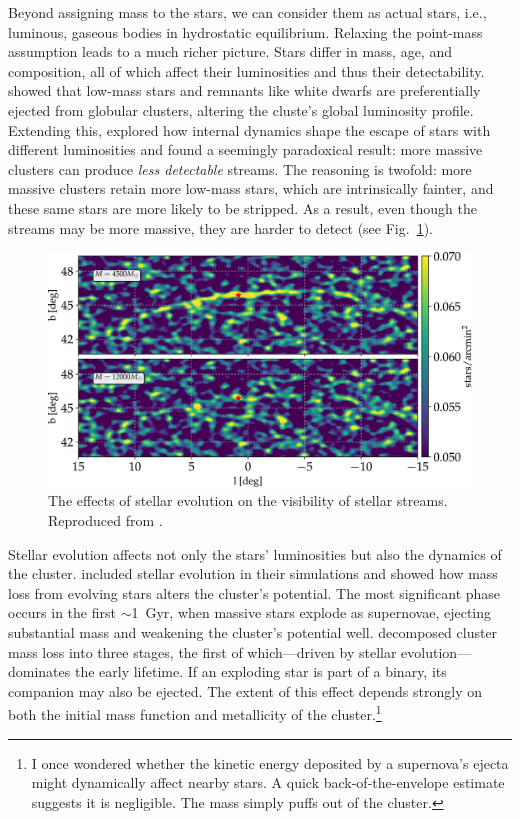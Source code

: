             Beyond assigning mass to the stars, we can consider them as actual stars, i.e., luminous, gaseous bodies in hydrostatic equilibrium. Relaxing the point-mass assumption leads to a much richer picture. Stars differ in mass, age, and composition, all of which affect their luminosities and thus their detectability. \citet{2008A&A...490..151K} showed that low-mass stars and remnants like white dwarfs are preferentially ejected from globular clusters, altering the cluste's global luminosity profile. Extending this, \citet{2018MNRAS.474.2479B} explored how internal dynamics shape the escape of stars with different luminosities and found a seemingly paradoxical result: more massive clusters can produce \textit{less detectable} streams. The reasoning is twofold: more massive clusters retain more low-mass stars, which are intrinsically fainter, and these same stars are more likely to be stripped. As a result, even though the streams may be more massive, they are harder to detect (see Fig.~\ref{fig:balbinot-2018}).
            \begin{figure}
                \includegraphics[width=\linewidth]{images/balbinot-2018.jpeg}
                \caption{The effects of stellar evolution on the visibility of stellar streams. Reproduced from \citep{2018MNRAS.474.2479B}.}
                \label{fig:balbinot-2018}
            \end{figure}
            Stellar evolution affects not only the stars' luminosities but also the dynamics of the cluster. \citet{2018MNRAS.474.2479B} included stellar evolution in their simulations and showed how mass loss from evolving stars alters the cluster's potential. The most significant phase occurs in the first $\sim$1~Gyr, when massive stars explode as supernovae, ejecting substantial mass and weakening the cluster's potential well. \citet{2010MNRAS.409..305L} decomposed cluster mass loss into three stages, the first of which—driven by stellar evolution—dominates the early lifetime. If an exploding star is part of a binary, its companion may also be ejected. The extent of this effect depends strongly on both the initial mass function and metallicity of the cluster.\footnote{I once wondered whether the kinetic energy deposited by a supernova's ejecta might dynamically affect nearby stars. A quick back-of-the-envelope estimate suggests it is negligible. The mass simply puffs out of the cluster.}
